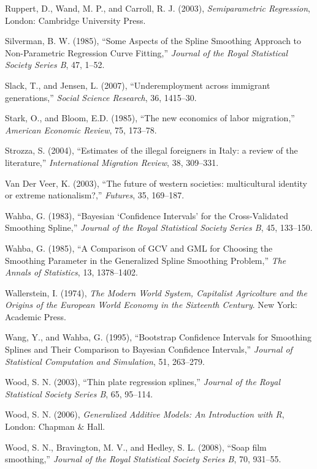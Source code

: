\documentclass[10pt] {article}
\theoremstyle{definition}
\theoremstyle{plain}
\begin{document}
\begin{thebibliography}{99}
\bibitem{} Ruppert, D., Wand, M. P., and Carroll, R. J. (2003), \textit{Semiparametric Regression}, London: Cambridge University Press.

\bibitem{} Silverman, B. W. (1985), ``Some Aspects of the Spline Smoothing Approach to Non-Parametric Regression Curve Fitting,'' \textit{Journal of the Royal Statistical Society Series B}, 47, 1--52.

\bibitem{} Slack, T., and Jensen, L. (2007), ``Underemployment across immigrant generations,'' \textit{Social Science Research}, 36, 1415--30.

\bibitem{} Stark, O., and Bloom, E.D. (1985), ``The new economics of labor migration,'' \textit{American Economic Review}, 75, 173--78.

\bibitem{} Strozza, S. (2004), ``Estimates of the illegal foreigners in Italy: a review of the literature,'' \textit{International Migration Review}, 38, 309--331.

\bibitem{} Van Der Veer, K. (2003), ``The future of western societies: multicultural identity or extreme nationalism?,'' \textit{Futures}, 35, 169--187.

\bibitem{} Wahba, G. (1983), ``Bayesian `Confidence Intervals' for the Cross-Validated Smoothing Spline,'' \textit{Journal of the Royal Statistical Society Series B}, 45, 133--150.

\bibitem{} Wahba, G. (1985), ``A Comparison of GCV and GML for Choosing the Smoothing Parameter in the Generalized Spline Smoothing Problem,'' \textit{The Annals of Statistics}, 13, 1378--1402.

\bibitem{} Wallerstein, I. (1974), \textit{The Modern World System, Capitalist Agricolture and the Origins of the European World Economy in the Sixteenth Century}. New York: Academic Press.

\bibitem{} Wang, Y., and Wahba, G. (1995), ``Bootstrap Confidence Intervals for Smoothing Splines and Their Comparison to Bayesian Confidence Intervals,'' \textit{Journal of Statistical Computation and Simulation}, 51, 263--279.

\bibitem{} Wood, S. N. (2003), ``Thin plate regression splines,'' \textit{Journal of the Royal Statistical Society Series B}, 65, 95--114.

\bibitem{} Wood, S. N. (2006), \textit{Generalized Additive Models: An Introduction with R}, London: Chapman $\&$ Hall.

\bibitem{} Wood, S. N., Bravington, M. V., and Hedley, S. L. (2008), ``Soap film smoothing,'' \textit{Journal of the Royal Statistical Society Series B}, 70, 931--55.


\end{thebibliography}
\end{document}
